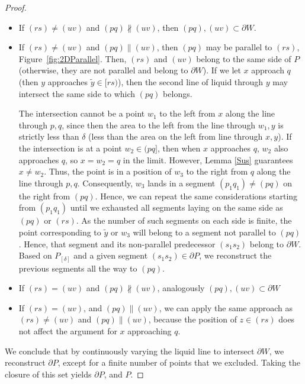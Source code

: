 \documentclass[10pt,a4paper]{amsart}
\begin{document}
\begin{proof}
    \begin{itemize}
     \item If $(rs)\neq (uv)$ and $(pq) \not \parallel (uv)$, then $(pq), (uv) \subset \partial W$.

     \item If $(rs)\neq (uv)$ and $(pq) \parallel (uv)$, then $(pq)$ may be parallel to $(rs)$, Figure~\ref{fig:2DParallel}. Then, $(rs)$ and $(uv)$ belong to the same side of $P$ (otherwise, they are not parallel and belong to $\partial W$). 
     If we let $x$ approach $q$ (then $y$ approaches $\tilde{y} \in [rs)$), then the second line of liquid through $y$ may intersect the same side to which $(pq)$ belongs.
     
     The intersection cannot be a point $w_1$ to the left from $x$ along the line through $p, q$, since then the area to the left from the line through $w_1, y$ is strictly less than $\delta$ (less than the area on the left from line through $x, y$). 
     If the intersection is at a point $w_2 \in (pq]$, then when $x$ approaches $q$, $w_2$ also approaches $q$, so $x=w_2=q$ in the limit. However, Lemma \ref{Sus} guarantees $x\neq w_2$. 
     Thus, the point is in a position of $w_3$ to the right from $q$ along the line through $p,q$.
    Consequently, $w_3$ lands in a segment $(p_1q_1) \neq (pq)$ on the right from $(pq)$. Hence, we can repeat the same considerations starting from $(p_1q_1)$ until we exhausted all segments laying on the same side as $(pq)$ or $(rs)$. 
    As the number of such segments on each side is finite, the point corresponding to $\tilde{y}$ or $w_3$ will belong to a segment not parallel to $(pq)$.
    Hence, that segment and its non-parallel predecessor $(s_1s_2)$ belong to $\partial W$. Based on $P_{[\delta]}$ and a given segment $(s_1s_2) \in \partial P$, we reconstruct the previous segments all the way to $(pq)$.
    

     \item If $(rs)=(uv)$ and $(pq) \not \parallel (uv)$, analogously $(pq), (uv) \subset \partial W$

     \item If $(rs)= (uv)$, and $(pq) \parallel (uv)$, we can apply the same approach as $(rs) \neq (uv)$ and $(pq) \parallel (uv)$, because the position of $z \in (rs)$ does not affect the argument for $x$ approaching $q$.
    \end{itemize}

We conclude that by continuously varying the liquid line to intersect $\partial W$, we reconstruct $\partial P$, except for a finite number of points that we excluded. Taking the closure of this set yields $\partial P$, and $P$.
\end{proof}
\end{document}
